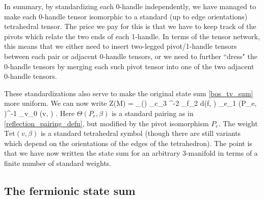 
In summary, by standardizing each 0-handle independently, we have managed to make each
0-handle tensor isomorphic to a standard (up to edge orientations) tetrahedral tensor.
The price we pay for this is that we have to keep track of the pivots which relate the two ends of each 1-handle.
In terms of the tensor network, this means that we either need to insert two-legged pivot/1-handle tensors between each pair
or adjacent 0-handle tensors, or we need to further ``dress" the 0-handle tensors by merging each such pivot tensor
into one of the two adjacent 0-handle tensors.

\medskip

These standardizations also serve to make the original state sum \eqref{bos_tv_sum} more uniform.
We can now write
\be \label{bos_tv_sum_std}
	Z(M) = \sum_{\beta\in\mcl(\mch)}
		\prod_{c\in\mch_3} \mcd^{-2}
		\prod_{f\in\mch_2} d(f, \beta)
		\prod_{e\in\mch_1} \Theta(P_e, \beta)^{-1}
		\prod_{v\in\mch_0} (v, \beta) .
\ee
Here $\Theta(P_e, \beta)$ is a standard pairing as in \eqref{reflection_pairing_defn}, but modified by the pivot isomorphism $P_e$.
The weight $\text{Tet}(v, \beta)$ is a standard tetrahedral symbol (though there are still variants which depend on
the orientations of the edges of the tetrahedron).
The point is that we have now written the state sum for an arbitrary 3-manifold in terms of a finite number
of standard weights.



\subsection{The fermionic state sum}

